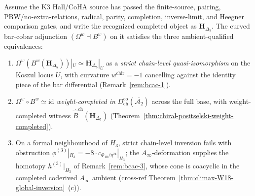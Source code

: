 \begin{theorem}
\label{thm:bcac-trichotomy}
\ClaimStatusConditional
{}
Assume the K3 Hall/CoHA source has passed the finite-source, pairing,
PBW/no-extra-relations, radical, parity, completion, inverse-limit, and
Heegner comparison gates, and write the recognized completed object as
$\mathbf{H}_{\Delta_5}$. The curved bar-cobar adjunction
$(\Omega^w\dashv B^w)$ on it satisfies the three
ambient-qualified equivalences:
\begin{enumerate}
\item[\textup{(a)}] $\Omega^w(B^w(\mathbf{H}_{\Delta_5}))|_U
\simeq \mathbf{H}_{\Delta_5}|_U$ as a \emph{strict chain-level
quasi-isomorphism} on the Koszul locus $U$, with curvature
$w^{\mathrm{chir}} = -1$ cancelling against the identity piece
of the bar differential
(Remark~\ref{rem:bcac-1}).
\item[\textup{(b)}] $\Omega^w\circ B^w \simeq \mathrm{id}$
\emph{weight-completed in}
$D^{\mathrm{co}}_{\mathrm{ch}}(\overline{\mathcal{A}_2})$ across
the full base, with weight-completed witness
$\widehat{\bar B}^{\mathrm{ch}}(\mathbf{H}_{\Delta_5})$
(Theorem~\ref{thm:chiral-positselski-weight-completed}).
\item[\textup{(c)}] On a formal neighbourhood of $H_3$, strict
chain-level inversion fails with obstruction
$\phi^{(3)}|_{H_3} = -8\cdot c_{\Phi_{10}/\eta^{24}}|_{H_3}$; the
$A_\infty$-deformation supplies the homotopy $h^{(3)}|_{H_3}$ of
Remark~\ref{rem:bcac-3}, whose cone is coacyclic in the
completed coderived $A_\infty$ ambient
(cross-ref Theorem~\ref{thm:climax-W18-global-inversion}~(c)).
\end{enumerate}
\end{theorem}

